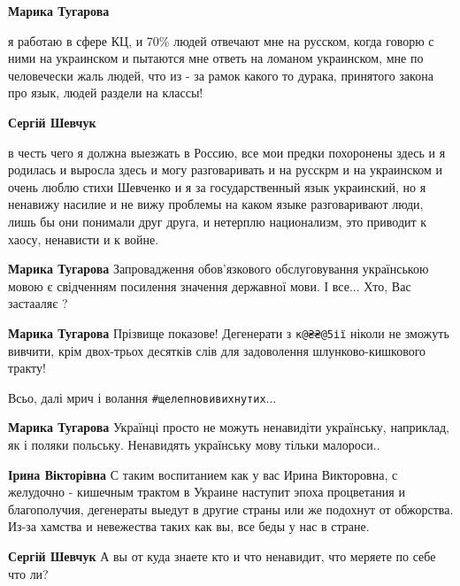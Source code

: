 \begin{itemize}
\begin{itemize}
\textbf{Марика Тугарова} 

я работаю в сфере КЦ, и 70\% людей отвечают мне на русском, когда говорю с ними
на украинском и пытаются мне ответь на ломаном украинском, мне по человечески
жаль людей, что из - за рамок какого то дурака, принятого закона про язык,
людей раздели на классы!


\textbf{Сергій Шевчук} 

в честь чего я должна выезжать в Россию, все мои предки похоронены здесь и я
родилась и выросла здесь и могу разговаривать и на русскрм и на украинском и
очень люблю стихи Шевченко и я за государственный язык украинский, но я
ненавижу насилие и не вижу проблемы на каком языке разговаривают люди, лишь бы
они понимали друг друга, и нетерплю национализм, это приводит к хаосу,
ненависти и к войне.



\textbf{Марика Тугарова} Запровадження обов'язкового обслуговування українською
мовою є свідченням посилення значення державної мови. І все... Хто, Вас
застааляє ?

\textbf{Марика Тугарова}
Прізвище показове! Дегенерати з \verb|к@₴₴@5ії| ніколи не зможуть вивчити, крім
двох-трьох десятків слів для задоволення шлунково-кишкового тракту!

Всьо, далі мрич і волання \verb|#щелепновивихнутих|...

\textbf{Марика Тугарова} Українці просто не можуть ненавидіти українську,
наприклад, як і поляки польську.  Ненавидять українську мову тільки малороси..



\textbf{Ірина Вікторівна} С таким воспитанием как у вас Ирина Викторовна, с
желудочно - кишечным трактом в Украине наступит эпоха процветания и
благополучия, дегенераты выедут в другие страны или же подохнут от обжорства.
Из-за хамства и невежества таких как вы, все беды у нас в стране.

\textbf{Сергій Шевчук} А вы от куда знаете кто и что ненавидит, что меряете по себе что ли?


\end{itemize}
\end{itemize}
